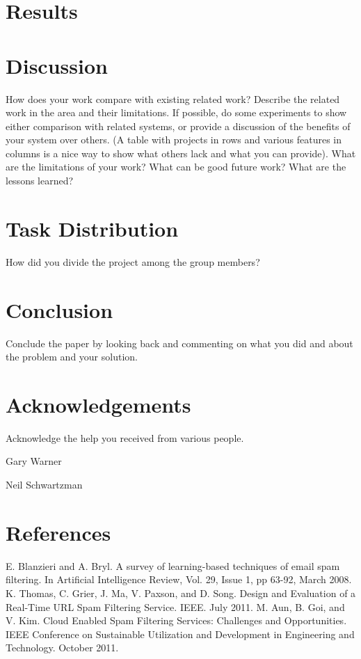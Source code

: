 \documentclass[11pt]{article}
\begin{document}
\begin{multicols}{2}
  \section{Results}

  \section{Discussion}
 How does your work compare with existing related work? Describe the related work in the area and their limitations. If possible, do some experiments to show either comparison with related systems, or provide a discussion of the benefits of your system over others. (A table with projects in rows and various features in columns is a nice way to show what others lack and what you can provide). What are the limitations of your work? What can be good future work? What are the lessons learned?
 
  \section{Task Distribution}
 How did you divide the project among the group members?

  \section{Conclusion}
Conclude the paper by looking back and commenting on what you did and about the problem and your solution.

  \section*{Acknowledgements}
Acknowledge the help you received from various people.
 
Gary Warner
 

  Neil Schwartzman

  \section*{References}
  E. Blanzieri and A. Bryl. A survey of learning-based techniques of email spam filtering. In Artificial Intelligence Review, Vol. 29, Issue 1, pp 63-92, March 2008.
K. Thomas, C. Grier, J. Ma, V. Paxson, and D. Song. Design and Evaluation of a Real-Time URL Spam Filtering Service. IEEE. July 2011.
M. Aun, B. Goi, and V. Kim. Cloud Enabled Spam Filtering Services: Challenges and Opportunities. IEEE Conference on Sustainable Utilization and Development in Engineering and Technology. October 2011.

\end{multicols} 
\end{document}
